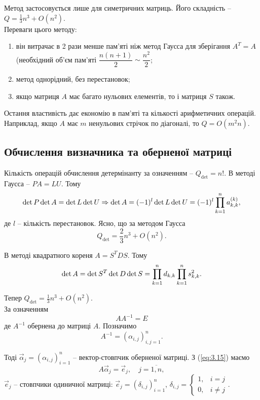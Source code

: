 Метод застосовується лише для симетричних матриць. Його складність -- $Q = \frac13 n^3 + O(n^2)$. \\

Переваги цього методу:
\begin{enumerate}
	\item він витрачає в 2 рази менше пам'яті ніж метод Гаусса для зберігання $A^T = A$ (необхідний об'єм пам'яті $\dfrac{n(n+1)}{2} \sim \dfrac{n^2}{2}$;
	\item метод однорідний, без перестановок;
	\item якщо матриця $A$ має багато нульових елементів, то і матриця $S$ також.
\end{enumerate}
Остання властивість дає економію в пам'яті та кількості арифметичних операцій. Наприклад, якщо $A$ має $m$ ненульових стрічок по діагоналі, то $Q = O(m^2n)$.

\subsection{Обчислення визначника та оберненої матриці}

Кількість операцій обчислення детермінанту за означенням -- $Q_{\det} = n!$. В методі Гаусса -- $PA = LU$. Тому 
\begin{equation}
	\label{eq:3.13} 
	\det P \det A = \det L \det U \Rightarrow \det A = (-1)^l \det L \det U = (-1)^l \displaystyle\prod\limits_{k=1}^n a_{k,k}^{(k)},
\end{equation}
де $l$ -- кількість перестановок. Ясно, що за методом Гаусса \[Q_{\det} = \dfrac 23 n^3 + O (n^2) .\]

В методі квадратного кореня $A = S^T D S$. Тому 
\begin{equation}
	\label{eq:3.14}
	\det A = \det S^T \det D \det S = \displaystyle\prod\limits_{k=1}^n d_{k,k} \displaystyle\prod\limits_{k=1}^n s_{k,k}^2.
\end{equation}

Тепер $Q_{\det} = \frac 13 n^3 + O(n^2)$. \\

За означенням 
\begin{equation}
	\label{eq:3.15}
	AA^{-1} = E
\end{equation}
де $A^{-1}$ обернена до матриці $A$. Позначимо
\[ A^{-1} = (\alpha_{i,j})_{i,j=1}^n.\] 

Тоді $\vec \alpha_j = (\alpha_{i,j})_{i=1}^n$ -- вектор-стовпчик оберненої матриці. З (\ref{eq:3.15}) маємо
\begin{equation}
	\label{eq:3.16}
	A \vec \alpha_j = \vec e_j, \quad j = \overline{1, n},
\end{equation}
$\vec e_j$ -- стовпчики одиничної матриці: $\vec e_j = (\delta_{i,j})_{i=1}^n$, $\delta_{i,j} = \begin{cases} 1, & i = j \\ 0, & i \ne j \end{cases}$. \\

